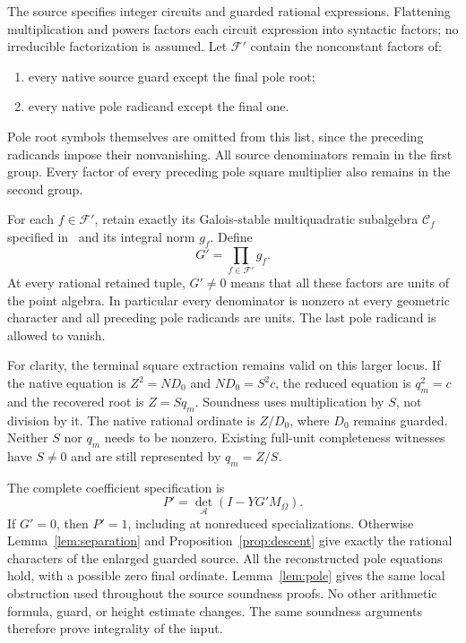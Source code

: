 \documentclass[11pt,a4paper]{article}
\begin{document}
The source specifies integer circuits and guarded rational expressions.
Flattening multiplication and powers factors each circuit expression
into syntactic factors; no irreducible factorization is assumed.
Let $\mathcal F'$ contain the nonconstant factors of:
\begin{enumerate}
\item every native source guard except the final pole root;
\item every native pole radicand except the final one.
\end{enumerate}
Pole root symbols themselves are omitted from this list, since the
preceding radicands impose their nonvanishing. All source denominators
remain in the first group. Every factor of every preceding pole square
multiplier also remains in the second group.

For each $f\in\mathcal F'$, retain exactly its Galois-stable
multiquadratic subalgebra $\mathcal C_f$ specified in~\cite{Subalgebra}
and its integral norm $g_f$. Define
\begin{equation}\label{eq:guard}
                         G'=\prod_{f\in\mathcal F'}g_f.
\end{equation}
At every rational retained tuple, $G'\ne0$ means that all these factors
are units of the point algebra. In particular every denominator is
nonzero at every geometric character and all preceding pole radicands
are units. The last pole radicand is allowed to vanish.

For clarity, the terminal square extraction remains valid on this
larger locus. If the native equation is $Z^2=ND_0$ and
$ND_0=S^2c$, the reduced equation is $q_m^2=c$ and the recovered root
is $Z=S q_m$. Soundness uses multiplication by $S$, not division by it.
The native rational ordinate is $Z/D_0$, where $D_0$ remains guarded.
Neither $S$ nor $q_m$ needs to be nonzero. Existing full-unit
completeness witnesses have $S\ne0$ and are still represented by
$q_m=Z/S$.

The complete coefficient specification is
\begin{equation}\label{eq:polynomial}
                       P'=\det_{\mathcal A}(I-YG'M_\Omega).
\end{equation}
If $G'=0$, then $P'=1$, including at nonreduced specializations.
Otherwise Lemma~\ref{lem:separation} and
Proposition~\ref{prop:descent} give exactly the rational characters
of the enlarged guarded source. All the reconstructed pole equations
hold, with a possible zero final ordinate. Lemma~\ref{lem:pole}
gives the same local obstruction used throughout the source soundness
proofs. No other arithmetic formula, guard, or height estimate changes.
The same soundness arguments therefore prove integrality of the input.
\end{document}
